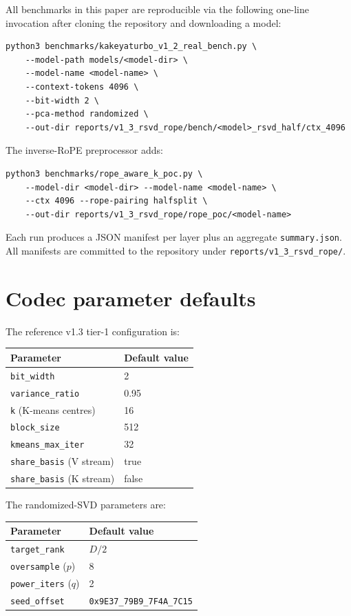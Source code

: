 \documentclass[11pt,a4paper]{article}
\theoremstyle{definition}
\theoremstyle{plain}
\begin{document}
All benchmarks in this paper are reproducible via the following one-line invocation after cloning the repository and downloading a model:
\begin{verbatim}
python3 benchmarks/kakeyaturbo_v1_2_real_bench.py \
    --model-path models/<model-dir> \
    --model-name <model-name> \
    --context-tokens 4096 \
    --bit-width 2 \
    --pca-method randomized \
    --out-dir reports/v1_3_rsvd_rope/bench/<model>_rsvd_half/ctx_4096
\end{verbatim}
The inverse-RoPE preprocessor adds:
\begin{verbatim}
python3 benchmarks/rope_aware_k_poc.py \
    --model-dir <model-dir> --model-name <model-name> \
    --ctx 4096 --rope-pairing halfsplit \
    --out-dir reports/v1_3_rsvd_rope/rope_poc/<model-name>
\end{verbatim}

Each run produces a JSON manifest per layer plus an aggregate \verb|summary.json|. All manifests are committed to the repository under \verb|reports/v1_3_rsvd_rope/|.

\section{Codec parameter defaults}
\label{app:params}

The reference v1.3 tier-1 configuration is:
\begin{center}
\begin{tabular}{ll}
  \toprule
  Parameter & Default value \\
  \midrule
  \texttt{bit\_width} & 2 \\
  \texttt{variance\_ratio} & 0.95 \\
  \texttt{k} (K-means centres) & 16 \\
  \texttt{block\_size} & 512 \\
  \texttt{kmeans\_max\_iter} & 32 \\
  \texttt{share\_basis} (V stream) & true \\
  \texttt{share\_basis} (K stream) & false \\
  \bottomrule
\end{tabular}
\end{center}

The randomized-SVD parameters are:
\begin{center}
\begin{tabular}{ll}
  \toprule
  Parameter & Default value \\
  \midrule
  \texttt{target\_rank} & $D/2$ \\
  \texttt{oversample} ($p$) & 8 \\
  \texttt{power\_iters} ($q$) & 2 \\
  \texttt{seed\_offset} & \texttt{0x9E37\_79B9\_7F4A\_7C15} \\
  \bottomrule
\end{tabular}
\end{center}
\end{document}
